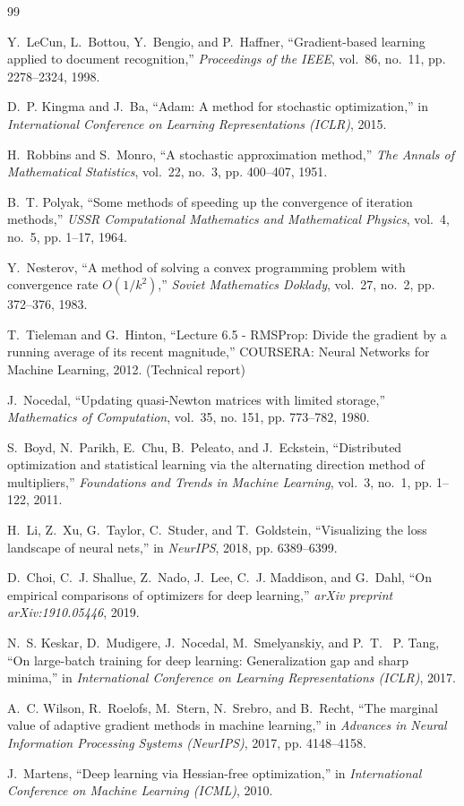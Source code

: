 \documentclass[12pt]{article}
\begin{document}
\begin{thebibliography}{99}

Y.~LeCun, L.~Bottou, Y.~Bengio, and P.~Haffner,
``Gradient-based learning applied to document recognition,''
\emph{Proceedings of the IEEE}, vol.~86, no.~11, pp. 2278--2324, 1998.

D.~P. Kingma and J.~Ba,
``Adam: A method for stochastic optimization,''
in \emph{International Conference on Learning Representations (ICLR)}, 2015.

H.~Robbins and S.~Monro,
``A stochastic approximation method,''
\emph{The Annals of Mathematical Statistics}, vol.~22, no.~3, pp. 400--407, 1951.

B.~T. Polyak,
``Some methods of speeding up the convergence of iteration methods,''
\emph{USSR Computational Mathematics and Mathematical Physics}, vol.~4, no.~5, pp. 1--17, 1964.

Y.~Nesterov,
``A method of solving a convex programming problem with convergence rate $O(1/k^2)$,''
\emph{Soviet Mathematics Doklady}, vol.~27, no.~2, pp. 372--376, 1983.

T.~Tieleman and G.~Hinton,
``Lecture 6.5 - RMSProp: Divide the gradient by a running average of its recent magnitude,''
COURSERA: Neural Networks for Machine Learning, 2012. (Technical report)

J.~Nocedal,
``Updating quasi-Newton matrices with limited storage,''
\emph{Mathematics of Computation}, vol.~35, no. 151, pp. 773--782, 1980.

S.~Boyd, N.~Parikh, E.~Chu, B.~Peleato, and J.~Eckstein,
``Distributed optimization and statistical learning via the alternating direction method of multipliers,''
\emph{Foundations and Trends in Machine Learning}, vol.~3, no.~1, pp. 1--122, 2011.

H.~Li, Z.~Xu, G.~Taylor, C.~Studer, and T.~Goldstein,
``Visualizing the loss landscape of neural nets,''
in \emph{NeurIPS}, 2018, pp. 6389--6399.

D.~Choi, C.~J. Shallue, Z.~Nado, J.~Lee, C.~J. Maddison, and G.~Dahl,
``On empirical comparisons of optimizers for deep learning,''
\emph{arXiv preprint arXiv:1910.05446}, 2019.

N.~S. Keskar, D.~Mudigere, J.~Nocedal, M.~Smelyanskiy, and P.~T. ~P. Tang,
``On large-batch training for deep learning: Generalization gap and sharp minima,''
in \emph{International Conference on Learning Representations (ICLR)}, 2017.

A.~C. Wilson, R.~Roelofs, M.~Stern, N.~Srebro, and B.~Recht,
``The marginal value of adaptive gradient methods in machine learning,''
in \emph{Advances in Neural Information Processing Systems (NeurIPS)}, 2017, pp. 4148--4158.

J.~Martens,
``Deep learning via Hessian-free optimization,''
in \emph{International Conference on Machine Learning (ICML)}, 2010.

\end{thebibliography}
\end{document}
